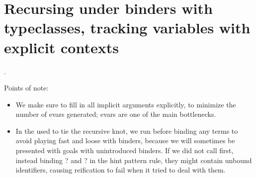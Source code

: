 \begin{coqdoccode}
\end{coqdoccode}
\section{Recursing under binders with typeclasses, tracking variables with explicit contexts}

\begin{coqdoccode}
\coqdocnoindent
{}  .\coqdoceol
\coqdocemptyline
\end{coqdoccode}
Points of note:



\begin{itemize}
\item  We make sure to fill in all implicit arguments explicitly, to
      minimize the number of evars generated; evars are one of the
      main bottlenecks.



\item  In the  used to tie the recursive knot, we run 
      before binding any terms to avoid playing fast and loose with
      binders, because we will sometimes be presented with goals with
      unintroduced binders.  If we did not call  first,
      instead binding ? and ? in the hint pattern rule,
      they might contain unbound identifiers, causing reification to
      fail when it tried to deal with them. 
\end{itemize}
